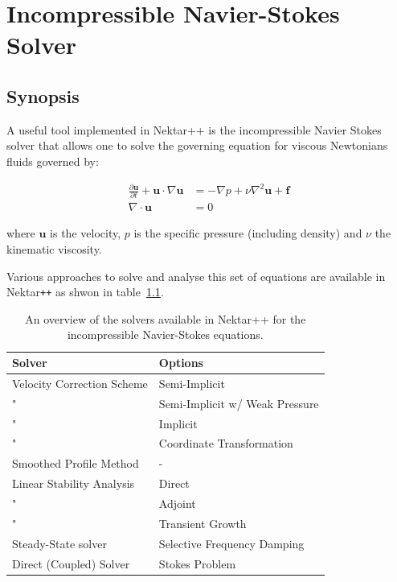 \chapter{Incompressible Navier-Stokes Solver}
\label{IncNSsolver}

\section{Synopsis}
A useful tool implemented in Nektar++ is the incompressible Navier
Stokes solver that allows one to solve the governing equation for
viscous Newtonians fluids governed by:

\begin{subequations}
\begin{align}
    \frac{\partial \mathbf{u}}{\partial t} + \mathbf{u} \cdot \nabla \mathbf{u} &= -\nabla p + \nu \nabla^2 \mathbf{u} +  \mathbf{f} \label{eqn.NSmom} \\
    \nabla \cdot \mathbf{u} &= 0
\end{align}
 \end{subequations}

where $\mathbf{u}$ is the velocity, $p$ is the specific pressure (including
density) and $\nu$ the kinematic viscosity.

Various approaches to solve and analyse this set of equations are 
available in Nektar\texttt{++} as shwon in table~\ref{tab.IncNSSolvers}.

\begin{table}
    \centering
\caption{An overview of the solvers available in Nektar++ for the incompressible Navier-Stokes equations.}
\begin{tabular}{ll}
    Solver & Options\\
    \toprule
    Velocity Correction Scheme & Semi-Implicit\\
    " & Semi-Implicit w/ Weak Pressure\\
    " & Implicit\\
    " & Coordinate Transformation \\
    Smoothed Profile Method & -\\
    Linear Stability Analysis & Direct \\
    " & Adjoint \\
    " & Transient Growth \\
    Steady-State solver & Selective Frequency Damping \\
    Direct (Coupled) Solver & Stokes Problem \\
\end{tabular}
\label{tab.IncNSSolvers}
\end{table}


